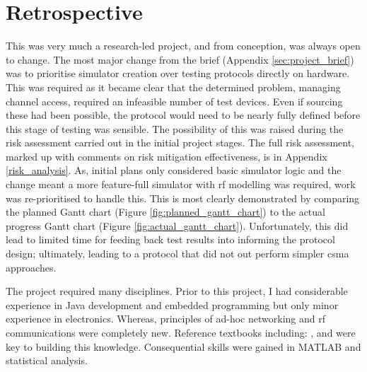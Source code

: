 \chapter{Retrospective}
This was very much a research-led project, and from conception, was always open to change. The most major change from the brief (Appendix \ref{sec:project_brief}) was to prioritise simulator creation over testing protocols directly on hardware. This was required as it became clear that the determined problem, managing channel access, required an infeasible number of test devices. Even if sourcing these had been possible, the protocol would need to be nearly fully defined before this stage of testing was sensible. The possibility of this was raised during the risk assessment carried out in the initial project stages. The full risk assessment, marked up with comments on risk mitigation effectiveness, is in Appendix \ref{risk_analysis}. As, initial plans only considered basic simulator logic and the change meant a more feature-full simulator with \ac{rf} modelling was required, work was re-prioritised to handle this. This is most clearly demonstrated by comparing the planned Gantt chart (Figure \ref{fig:planned_gantt_chart}) to the actual progress Gantt chart (Figure \ref{fig:actual_gantt_chart}). Unfortunately, this did lead to limited time for feeding back test results into informing the protocol design; ultimately, leading to a protocol that did not out perform simpler \ac{csma} approaches.

The project required many disciplines. Prior to this project, I had considerable experience in Java development and embedded programming but only minor experience in electronics. Whereas, principles of ad-hoc networking and \ac{rf} communications were completely new. Reference textbooks including: \cite{3YP:WSN_BOOK}, \cite{3YP:ANTENNA_BOOK} and \cite{3YP:RF_BOOK} were key to building this knowledge. Consequential skills were gained in MATLAB and statistical analysis.